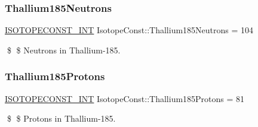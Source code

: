 \subsubsection{\texorpdfstring{Thallium185\+Neutrons}{Thallium185Neutrons}}
{\footnotesize\ttfamily \mbox{\hyperlink{group___isotope_const-_macros_ga5f18360b3e99483a35c32d789e62621c}{I\+S\+O\+T\+O\+P\+E\+C\+O\+N\+S\+T\+\_\+\+I\+NT}} Isotope\+Const\+::\+Thallium185\+Neutrons = 104}

\$ \$ Neutrons in Thallium-\/185. \mbox{\label{group___isotope_const-_thallium-_tl185_gafb7b53f90c8687c62ab5320d061ac28e}} 
\subsubsection{\texorpdfstring{Thallium185\+Protons}{Thallium185Protons}}
{\footnotesize\ttfamily \mbox{\hyperlink{group___isotope_const-_macros_ga5f18360b3e99483a35c32d789e62621c}{I\+S\+O\+T\+O\+P\+E\+C\+O\+N\+S\+T\+\_\+\+I\+NT}} Isotope\+Const\+::\+Thallium185\+Protons = 81}

\$ \$ Protons in Thallium-\/185. 